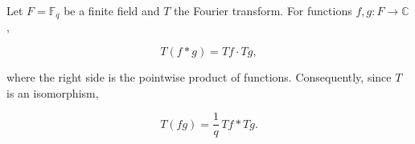 Let $F = \mathbb{F}_q$ be a finite field and $T$ the Fourier transform. For functions $f, g: F \to \mathbb{C}$,

$$T(f * g) = Tf \cdot Tg,$$

where the right side is the pointwise product of functions. Consequently, since $T$ is an isomorphism,

$$T(fg) = \frac{1}{q} \, Tf * Tg.$$
